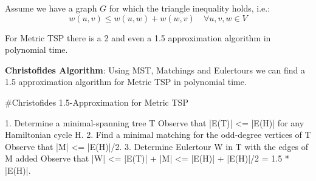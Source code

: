 Assume we have a graph $G$ for which the triangle inequality holds, i.e.:
$$w(u,v) \le w(u,w) + w(w,v) \quad \forall u,v,w \in V$$

\begin{theorem}
    For Metric TSP there is a 2 and even a 1.5 approximation algorithm in polynomial time.
\end{theorem}


\begin{theorem}
    \textbf{Christofides Algorithm}: Using MST, Matchings and Eulertours we can find a 1.5 approximation algorithm for Metric TSP in polynomial time.
\end{theorem}

\begin{algorithm}
 #Christofides 1.5-Approximation for Metric TSP
    
1.  Determine a minimal-spanning tree T
    Observe that |E(T)| <= |E(H)| for any Hamiltonian cycle H.
2.  Find a minimal matching for the odd-degree vertices of T
    Observe that |M| <= |E(H)|/2.
3.  Determine Eulertour W in T with the edges of M added
    Observe that |W| <= |E(T)| + |M| <= |E(H)| + |E(H)|/2 = 1.5 * |E(H)|.
\end{algorithm}